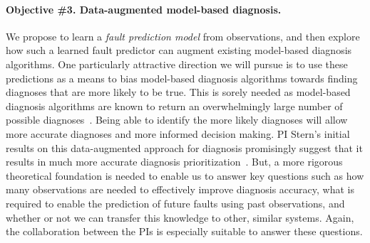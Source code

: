 \documentclass[12pt]{article}
\newcommand{\note}[1]{\textbf{\textit{#1}}}
\begin{document}
\vspace{-0.35cm}
\paragraph{Objective \#3. Data-augmented model-based diagnosis.} 
We propose to learn a {\em fault prediction model} from observations, and then explore how such a learned fault predictor can augment existing model-based diagnosis algorithms. 
One particularly attractive direction we will pursue is to use these predictions as a means to bias model-based diagnosis algorithms towards finding diagnoses that are more likely to be true. This is sorely needed as model-based diagnosis algorithms are known to return an overwhelmingly large number of possible diagnoses~\cite{stern2015many}. Being able to identify the more likely diagnoses will allow more accurate diagnoses and more informed decision making. PI Stern's initial results on this data-augmented approach for diagnosis promisingly suggest that it results in much more accurate diagnosis prioritization~\cite{elmishali2016dataAugmented}. But, a more rigorous theoretical foundation is needed to enable us to answer key questions such as how many observations are needed to effectively improve diagnosis accuracy, what is required to enable the prediction of future faults using past observations, and whether or not we can transfer this knowledge to other, similar systems. Again, the collaboration between the PIs is especially suitable to answer these questions. 




\end{document}
